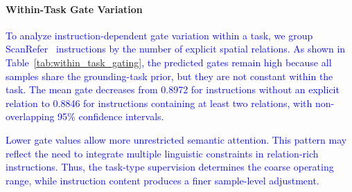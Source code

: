 \documentclass[lettersize,journal]{IEEEtran}
\begin{document}
\textcolor{blue}{
\begin{table}[tbp]
\centering
\footnotesize
\setlength{\tabcolsep}{4.2pt}
\caption{\textbf{Within-task gate statistics on ScanRefer.} Instructions are grouped by the number of explicit spatial relations. Each gate value is the per-sample mean over attention heads.}
\label{tab:within_task_gating}
\end{table}
}

\paragraph*{Within-Task Gate Variation}
\textcolor{blue}{To analyze instruction-dependent gate variation within a task, we group ScanRefer~\cite{scanrefer2020} instructions by the number of explicit spatial relations. As shown in Table~\ref{tab:within_task_gating}, the predicted gates remain high because all samples share the grounding-task prior, but they are not constant within the task. The mean gate decreases from 0.8972 for instructions without an explicit relation to 0.8846 for instructions containing at least two relations, with non-overlapping 95\% confidence intervals.}

\textcolor{blue}{Lower gate values allow more unrestricted semantic attention. This pattern may reflect the need to integrate multiple linguistic constraints in relation-rich instructions. Thus, the task-type supervision determines the coarse operating range, while instruction content produces a finer sample-level adjustment.}
\end{document}
